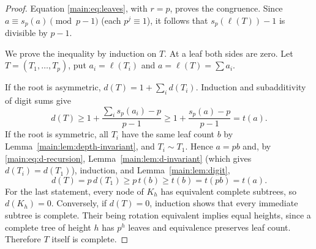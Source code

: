 \documentclass[11pt]{article}
\theoremstyle{definition}
\theoremstyle{remark}
\numberwithin{equation}{section}
\numberwithin{figure}{section}
\begin{document}
\begin{proof}
Equation \eqref{main:eq:leaves}, with $r=p$, proves the congruence.  Since $a\equiv s_p(a)\pmod{p-1}$ (each $p^j\equiv1$), it follows that $s_p(\ell(T))-1$ is divisible by $p-1$.

We prove the inequality by induction on $T$.  At a leaf both sides are zero.  Let $T=(T_1,\ldots,T_p)$, put $a_i=\ell(T_i)$ and $a=\ell(T)=\sum a_i$.

If the root is asymmetric, $d(T)=1+\sum_id(T_i)$.  Induction and subadditivity of digit sums give
\[
 d(T)\ge1+\frac{\sum_is_p(a_i)-p}{p-1}
 \ge1+\frac{s_p(a)-p}{p-1}=t(a).
\]
If the root is symmetric, all $T_i$ have the same leaf count $b$
by Lemma~\ref{main:lem:depth-invariant}, and $T_i\sim T_1$.
Hence $a=pb$ and, by \eqref{main:eq:d-recursion}, Lemma~\ref{main:lem:d-invariant} (which gives $d(T_i)=d(T_1)$), induction,
and Lemma~\ref{main:lem:digit},
\[
 d(T)=p\,d(T_1)\ge p\,t(b)\ge t(b)=t(pb)=t(a).
\]
For the last statement, every node of $K_h$ has equivalent complete subtrees, so $d(K_h)=0$.  Conversely, if $d(T)=0$, induction shows that every immediate subtree is complete.  Their being rotation equivalent implies equal heights, since a complete tree of height $h$ has $p^h$ leaves and equivalence preserves leaf count.  Therefore $T$ itself is complete.
\end{proof}
\end{document}
